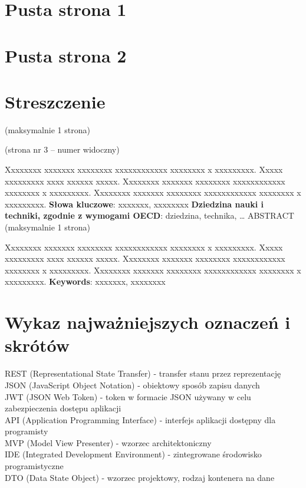 \documentclass[10pt,twoside,a4paper]{report}
\begin{document}
\chapter*{Pusta strona 1}
\chapter*{Pusta strona 2}
\renewcommand{\familydefault}{\sfdefault}
\chapter*{Streszczenie}
(maksymalnie 1 strona)\par
(strona nr 3 – numer widoczny)\par
Xxxxxxxx xxxxxxx xxxxxxxx xxxxxxxxxxxx xxxxxxxx x xxxxxxxxx. Xxxxx xxxxxxxxx xxxx xxxxxx xxxxx. Xxxxxxxx xxxxxxx xxxxxxxx xxxxxxxxxxxx xxxxxxxx x xxxxxxxxx. Xxxxxxxx xxxxxxx xxxxxxxx xxxxxxxxxxxx xxxxxxxx x xxxxxxxxx. 
\newline\textbf{Słowa kluczowe}: xxxxxxx, xxxxxxxx
\newline\textbf{Dziedzina nauki i techniki, zgodnie z wymogami OECD}: 
dziedzina, technika, …
\newline ABSTRACT (maksymalnie 1 strona)
\par Xxxxxxxx xxxxxxx xxxxxxxx xxxxxxxxxxxx xxxxxxxx x xxxxxxxxx. Xxxxx xxxxxxxxx xxxx xxxxxx xxxxx. Xxxxxxxx xxxxxxx xxxxxxxx xxxxxxxxxxxx xxxxxxxx x xxxxxxxxx. Xxxxxxxx xxxxxxx xxxxxxxx xxxxxxxxxxxx xxxxxxxx x xxxxxxxxx.
\newline\textbf{Keywords}: xxxxxxx, xxxxxxxx

\tableofcontents
\chapter*{Wykaz najważniejszych oznaczeń i skrótów}
\noindent REST (Representational State Transfer) - transfer stanu przez reprezentację \\
JSON (JavaScript Object Notation) - obiektowy sposób zapisu danych \\
JWT (JSON Web Token) - token w formacie JSON używany w celu zabezpieczenia dostępu aplikacji \\
API (Application Programming Interface) - interfejs aplikacji dostępny dla programisty \\
MVP (Model View Presenter) - wzorzec architektoniczny\\
IDE (Integrated Development Environment) - zintegrowane środowisko programistyczne\\
DTO (Data State Object) - wzorzec projektowy, rodzaj kontenera na dane\\
\end{document}
